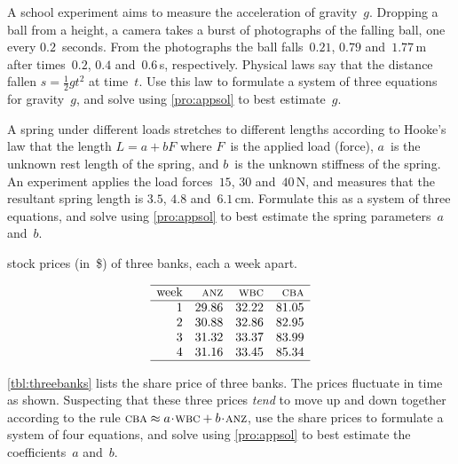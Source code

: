 \begin{exercise} \label{ex:} 
A school experiment aims to measure the acceleration of gravity~\(g\).
Dropping a ball from a height, a camera takes a burst of photographs of the falling ball, one every \(0.2\)~seconds.
From the photographs the ball falls~\(0.21\), \(0.79\) and~\(1.77\)\,m after times~\(0.2\), \(0.4\) and~\(0.6\)\,s, respectively.
Physical laws say that the distance fallen \(s=\tfrac12gt^2\) at time~\(t\).
Use this law to formulate a system of three equations for gravity~\(g\), and solve using \autoref{pro:appsol} to best estimate~\(g\).
\end{exercise}


\begin{exercise} \label{ex:} 
A spring under different loads stretches to different lengths according to Hooke's law that the length \(L=a+bF\) where \(F\)~is the applied load (force), \(a\)~is the unknown rest length of the spring, and \(b\)~is the unknown stiffness of the spring.
An experiment applies the load forces~\(15\), \(30\) and~\(40\)\,N, and measures that the resultant spring length is \(3.5\), \(4.8\) and~\(6.1\)\,cm.
Formulate this as a system of three equations, and solve using \autoref{pro:appsol} to best estimate the spring parameters~\(a\) and~\(b\).
\end{exercise}


\begin{exercise} \label{ex:} 
\begin{table}
\caption{stock prices (in~\$) of three banks, each a week apart.}
\label{tbl:threebanks}
\begin{equation*}
\begin{array}{rrrr}
\hline
\text{week}&\textsc{anz}&\textsc{wbc}&\textsc{cba}
\\\hline
1&29.86&32.22&81.05\\
2&30.88&32.86&82.95\\
3&31.32&33.37&83.99\\
4&31.16&33.45&85.34\\
\hline
\end{array}
\end{equation*}
\end{table}
\autoref{tbl:threebanks} lists the share price of three banks. 
The prices fluctuate in time as shown.
Suspecting that these three prices \emph{tend} to move up and down together according to the rule \(\textsc{cba}\approx a\cdot\textsc{wbc}+b\cdot\textsc{anz}\), use the share prices to formulate a system of four equations, and solve using \autoref{pro:appsol} to best estimate the coefficients~\(a\) and~\(b\).
\end{exercise}






